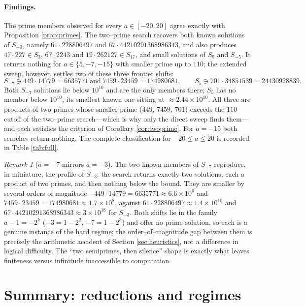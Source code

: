 \documentclass[11pt,reqno]{amsart}
\theoremstyle{plain}
\theoremstyle{definition}
\theoremstyle{remark}
\newtheorem{remark}{Remark}
\begin{document}
\paragraph{Findings.} The prime members observed for every $a\in[-20,20]$ agree exactly with Proposition \ref{prop:primes}. The two--prime search recovers both known solutions of $S_{-3}$, namely $61\cdot228806497$ and $67\cdot44210291368986343$, and also produces $47\cdot227\in S_3$, $67\cdot2243$ and $19\cdot262127\in S_{17}$, and small solutions of $S_9$ and $S_{-5}$. It returns nothing for $a\in\{5,-7,-15\}$ with smaller prime up to $110$; the extended sweep, however, settles two of these three frontier shifts:
\[
S_{-7}\ni 449\cdot14779=6635771\ \text{and}\ 7459\cdot23459=174980681,
\qquad
S_5\ni 701\cdot34851539=24430928839.
\]
Both $S_{-7}$ solutions lie below $10^{10}$ and are the only members there; $S_5$ has no member below $10^{10}$, its smallest known one sitting at $\approx2.44\times10^{10}$. All three are products of two primes whose smaller prime ($449$, $7459$, $701$) exceeds the $110$ cutoff of the two--prime search---which is why only the direct sweep finds them---and each satisfies the criterion of Corollary \ref{cor:twoprime}. For $a=-15$ both searches return nothing. The complete classification for $-20\le a\le20$ is recorded in Table \ref{tab:full}.

\begin{remark}[$a=-7$ mirrors $a=-3$]\label{rem:minus7}
The two known members of $S_{-7}$ reproduce, in miniature, the profile of $S_{-3}$: the search returns exactly two solutions, each a product of two primes, and then nothing below the bound. They are smaller by several orders of magnitude---$449\cdot14779=6635771\approx6.6\times10^{6}$ and $7459\cdot23459=174980681\approx1.7\times10^{8}$, against $61\cdot228806497\approx1.4\times10^{10}$ and $67\cdot44210291368986343\approx3\times10^{18}$ for $S_{-3}$. Both shifts lie in the family $a-1=-2^{k}$ ($-3=1-2^{2}$, $-7=1-2^{3}$) and offer no prime solution, so each is a genuine instance of the hard regime; the order--of--magnitude gap between them is precisely the arithmetic accident of Section \ref{sec:heuristics}, not a difference in logical difficulty. The ``two semiprimes, then silence'' shape is exactly what leaves finiteness versus infinitude inaccessible to computation.
\end{remark}

\section{Summary: reductions and regimes}\label{sec:summary}
\end{document}
